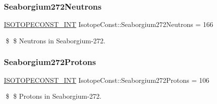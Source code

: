 \subsubsection{\texorpdfstring{Seaborgium272\+Neutrons}{Seaborgium272Neutrons}}
{\footnotesize\ttfamily \mbox{\hyperlink{group___isotope_const-_macros_ga5f18360b3e99483a35c32d789e62621c}{I\+S\+O\+T\+O\+P\+E\+C\+O\+N\+S\+T\+\_\+\+I\+NT}} Isotope\+Const\+::\+Seaborgium272\+Neutrons = 166}

\$ \$ Neutrons in Seaborgium-\/272. \mbox{\label{group___isotope_const-_seaborgium-_sg272_ga025889fbb3b3b1a7c61e3b85362ad036}} 
\subsubsection{\texorpdfstring{Seaborgium272\+Protons}{Seaborgium272Protons}}
{\footnotesize\ttfamily \mbox{\hyperlink{group___isotope_const-_macros_ga5f18360b3e99483a35c32d789e62621c}{I\+S\+O\+T\+O\+P\+E\+C\+O\+N\+S\+T\+\_\+\+I\+NT}} Isotope\+Const\+::\+Seaborgium272\+Protons = 106}

\$ \$ Protons in Seaborgium-\/272. 